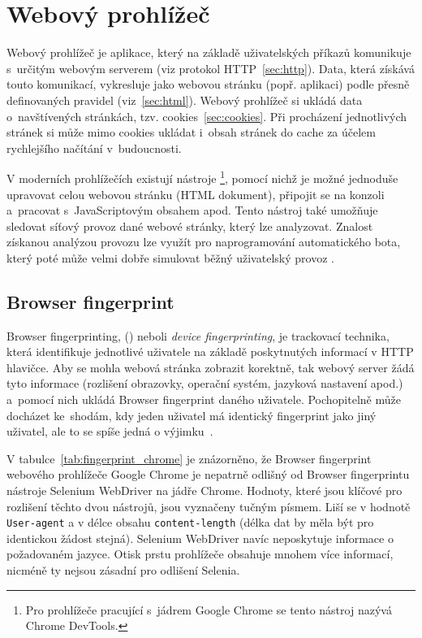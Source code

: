 \section{Webový prohlížeč}
\label{sec:web_browser}
Webový prohlížeč je aplikace, který na základě uživatelských příkazů komunikuje s~určitým webovým serverem (viz protokol HTTP~\ref{sec:http}). Data, která získává touto komunikací, vykresluje jako webovou stránku (popř. aplikaci) podle přesně definovaných pravidel (viz~\ref{sec:html}). Webový prohlížeč si ukládá data o~navštívených stránkách, tzv. cookies~\ref{sec:cookies}. Při procházení jednotlivých stránek si může mimo cookies ukládat i~obsah stránek do cache za účelem rychlejšího načítání v~budoucnosti.

V moderních prohlížečích existují nástroje \footnote{Pro prohlížeče pracující s~jádrem Google Chrome se tento nástroj nazývá Chrome DevTools.}, pomocí nichž je možné jednoduše upravovat celou webovou stránku (HTML dokument), připojit se na konzoli a~pracovat s~JavaScriptovým obsahem apod. Tento nástroj také umožňuje sledovat síťový provoz dané webové stránky, který lze analyzovat. Znalost získanou analýzou provozu lze využít pro naprogramování automatického bota, který poté může velmi dobře simulovat běžný uživatelský provoz \cite{bib:google_inspect}.

\subsection*{Browser fingerprint}
\label{sec:browser_fingerprint}
Browser fingerprinting, () neboli \textit{device fingerprinting}, je trackovací technika, která identifikuje jednotlivé uživatele na základě poskytnutých informací v HTTP hlavičce. Aby se mohla webová stránka zobrazit korektně, tak webový server žádá tyto informace (rozlišení obrazovky, operační systém, jazyková nastavení apod.) a~pomocí nich ukládá Browser fingerprint daného uživatele. Pochopitelně může docházet ke~shodám, kdy jeden uživatel má identický fingerprint jako jiný uživatel, ale to se spíše jedná o výjimku~\cite{bib:browser_fingerprint}.

V tabulce~\ref{tab:fingerprint_chrome} je znázorněno, že Browser fingerprint webového prohlížeče Google Chrome je nepatrně odlišný od Browser fingerprintu nástroje Selenium WebDriver na jádře Chrome. Hodnoty, které jsou klíčové pro rozlišení těchto dvou nástrojů, jsou vyznačeny tučným písmem. Liší se v hodnotě \texttt{User-agent} a v délce obsahu \texttt{content-length} (délka dat by měla být pro identickou žádost stejná). Selenium WebDriver navíc neposkytuje informace o požadovaném jazyce. Otisk prstu prohlížeče obsahuje mnohem více informací, nicméně ty nejsou zásadní pro odlišení Selenia.


